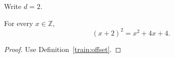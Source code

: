 \documentclass{article}
\newcommand{\offset}{2}
\begin{document}
\begin{definition}\label{train:offset}Write $d=\offset$.\end{definition}
\begin{theorem}\label{train:macro}
For every $x\in\mathbb{Z}$,
\[(x+\offset)^2=x^2+4x+4.\]
\end{theorem}
\begin{proof}Use Definition~\ref{train:offset}.\end{proof}
\end{document}
